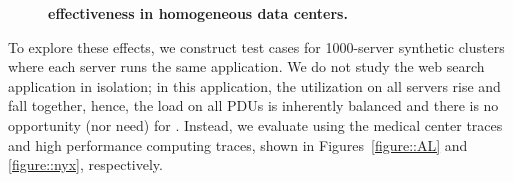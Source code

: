 \begin{figure}[t]
\centering
{}
\hspace{0.5in}
\vspace{-0.15 in}
\caption{ \textbf{\PowerRouting effectiveness in homogeneous data centers.} }
\vspace{-0.15 in}
\label{figure::homogenous}
\end{figure}

To explore these effects, we construct \PowerRouting test cases for 1000-server synthetic clusters where each server runs the same application.  We do not study the web search application in isolation; in this application, the utilization on all servers rise and fall together, hence, the load on all PDUs is inherently balanced and there is no opportunity (nor need) for \PowerRouting. Instead, we evaluate \PowerRouting using the medical center traces and high performance computing traces, shown in Figures~\ref{figure::AL} and \ref{figure::nyx}, respectively. 

